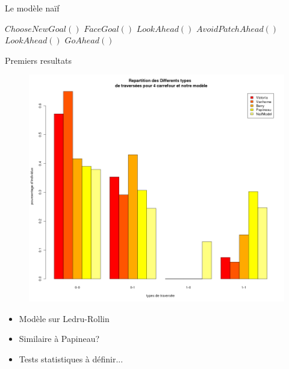 \documentclass[hyperref={pdfpagelabel=false},8pt, handout=show,show notes]{beamer}
\begin{document}
\begin{frame}{Le mod\`ele na\"if} 


\begin{algorithmic}
    \Loop
    \State $ChooseNewGoal()$
    \EndIf
    \State $FaceGoal()$
    \State $LookAhead()$
    \State $AvoidPatchAhead()$
    \State $LookAhead()$
    \EndWhile
    \State $GoAhead()$ 
    \EndLoop
\EndFunction

\end{algorithmic}

 \end{frame}

\begin{frame}{Premiers resultats}

\begin{figure}
 \includegraphics[height=.60\textwidth]{images/BarplotMontrealMode}
\end{figure}
\begin{itemize}
 \item Mod\`ele sur Ledru-Rollin
 \item Similaire \`a Papineau?
 \item Tests statistiques \`a d\'efinir...
\end{itemize}



\end{frame}

 
\end{document}
